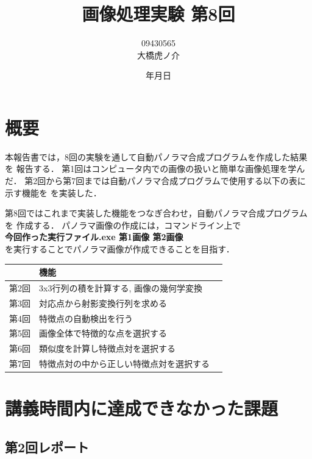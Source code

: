 \documentclass[11pt]{jarticle}
\begin{document}
\title{画像処理実験 第8回}
\author{09430565\\大橋虎ノ介}
\date{\number\year 年\number\month 月\number\day 日}
\maketitle

\section{概要}

本報告書では，8回の実験を通して自動パノラマ合成プログラムを作成した結果を
報告する．
第1回はコンピュータ内での画像の扱いと簡単な画像処理を学んだ．
第2回から第7回までは自動パノラマ合成プログラムで使用する以下の表に示す機能を
を実装した．

第8回ではこれまで実装した機能をつなぎ合わせ，自動パノラマ合成プログラムを
作成する．
パノラマ画像の作成には，コマンドライン上で\\
{\bf 今回作った実行ファイル.exe 第1画像 第2画像}\\
を実行することでパノラマ画像が作成できることを目指す．

\begin{table}[h]
    \begin{tabular}{lll}
         & 機能 \\ \hline
        第2回 & 3x3行列の積を計算する, 画像の幾何学変換 \\
        第3回 & 対応点から射影変換行列を求める \\
        第4回 & 特徴点の自動検出を行う \\
        第5回 & 画像全体で特徴的な点を選択する \\
        第6回 & 類似度を計算し特徴点対を選択する \\
        第7回 & 特徴点対の中から正しい特徴点対を選択する \\
        
    \end{tabular}
\end{table}

\section{講義時間内に達成できなかった課題}

\subsection{第2回レポート}
\end{document}
